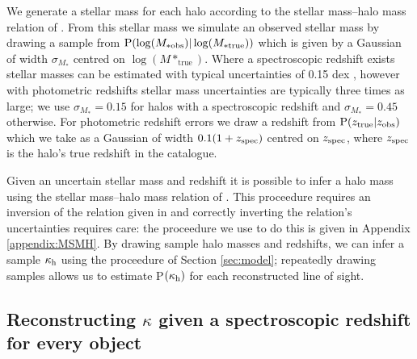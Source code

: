 \documentclass[useAMS,usenatbib]{mn2e}
\begin{document}
We generate a stellar mass for each halo according to the stellar mass--halo mass relation of 
\citet{BehrooziEtal2010}. From this stellar mass we simulate 
an observed stellar mass by drawing a sample from ${\rm P}(\log(M_{* \mathrm {obs}})|\log(M_{* \mathrm {true}}))$ which is given by a Gaussian of width $\sigma_{M_*}$ centred on $\log(M*_{\mathrm {true}})$. Where a spectroscopic redshift exists stellar masses can be estimated with typical uncertainties of 0.15 dex \citep{AugerEtal2009}, however with photometric redshifts stellar mass uncertainties are typically three times as large; we use $\sigma_{M_*}=0.15$ for halos with a spectroscopic redshift and $\sigma_{M_*}=0.45$ otherwise. For photometric redshift errors we draw a redshift from ${\rm P}(z_{\rm true}|z_{\rm obs})$ which we take as a Gaussian of width $0.1(1+z_{\rm spec})$ centred on $z_{\rm spec}$, where $z_{\rm spec}$ is the halo's true redshift in the \MS catalogue.

Given an uncertain stellar mass and redshift it is possible to infer a
halo mass using the stellar mass--halo mass relation of
\citet{BehrooziEtal2010}. This proceedure requires an inversion of the
relation given in \citet{BehrooziEtal2010} and correctly inverting the
relation's uncertainties requires care: the proceedure we use to do this
is given in Appendix \ref{appendix:MSMH}. By drawing sample halo masses
and redshifts, we can infer a sample $\kappa_{\rm h}$ using the proceedure of
Section \ref{sec:model}; repeatedly drawing samples allows us to
estimate P$(\kappa_{\rm h})$ for each reconstructed line of sight.

\subsection{Reconstructing $\kappa$ given a spectroscopic redshift for every object}
\end{document}
